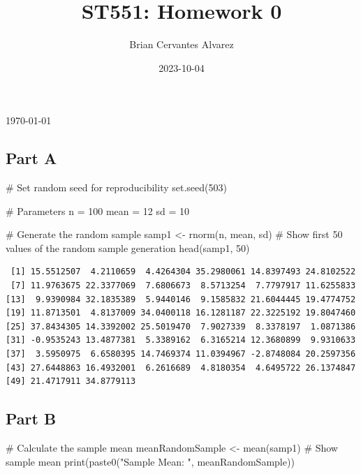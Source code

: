 \documentclass[
  letterpaper,
  DIV=11,
  numbers=noendperiod]{scrartcl}
\title{ST551: Homework 0}
\author{Brian Cervantes Alvarez}
\date{2023-10-04}
\makeatletter
\newenvironment{Shaded}{}{}
\newcommand{\CommentTok}[1]{\textcolor[rgb]{0.57,0.51,0.45}{#1}}
\newcommand{\DecValTok}[1]{\textcolor[rgb]{0.96,0.45,0.00}{#1}}
\newcommand{\FunctionTok}[1]{\textcolor[rgb]{0.41,0.62,0.42}{#1}}
\newcommand{\NormalTok}[1]{\textcolor[rgb]{0.24,0.22,0.21}{#1}}
\newcommand{\OtherTok}[1]{\textcolor[rgb]{0.41,0.62,0.42}{#1}}
\newcommand{\StringTok}[1]{\textcolor[rgb]{0.60,0.59,0.10}{#1}}
\renewcommand{\maketitle}{\bgroup\setlength{\parindent}{0pt}
\begin{flushleft}
  {\sffamily\huge\textbf{\MakeUppercase{\@title}}} \vspace{0.3cm} \newline
  {\Large {\@subtitle}} \newline
  {\large\@author} \newline
  {\large\today} %
\end{flushleft}\egroup
}
\makeatother
\begin{document}
\maketitle

\pagestyle{mystyle}

\subsection{Part A}\label{part-a}

\begin{Shaded}
\begin{Highlighting}[]
\CommentTok{\# Set random seed for reproducibility}
\FunctionTok{set.seed}\NormalTok{(}\DecValTok{503}\NormalTok{)}

\CommentTok{\# Parameters}
\NormalTok{n }\OtherTok{=} \DecValTok{100}
\NormalTok{mean }\OtherTok{=} \DecValTok{12}
\NormalTok{sd }\OtherTok{=} \DecValTok{10}

\CommentTok{\# Generate the random sample }
\NormalTok{samp1 }\OtherTok{\textless{}{-}} \FunctionTok{rnorm}\NormalTok{(n, mean, sd)}
\CommentTok{\# Show first 50 values of the random sample generation}
\FunctionTok{head}\NormalTok{(samp1, }\DecValTok{50}\NormalTok{)}
\end{Highlighting}
\end{Shaded}

\begin{verbatim}
 [1] 15.5512507  4.2110659  4.4264304 35.2980061 14.8397493 24.8102522
 [7] 11.9763675 22.3377069  7.6806673  8.5713254  7.7797917 11.6255833
[13]  9.9390984 32.1835389  5.9440146  9.1585832 21.6044445 19.4774752
[19] 11.8713501  4.8137009 34.0400118 16.1281187 22.3225192 19.8047460
[25] 37.8434305 14.3392002 25.5019470  7.9027339  8.3378197  1.0871386
[31] -0.9535243 13.4877381  5.3389162  6.3165214 12.3680899  9.9310633
[37]  3.5950975  6.6580395 14.7469374 11.0394967 -2.8748084 20.2597356
[43] 27.6448863 16.4932001  6.2616689  4.8180354  4.6495722 26.1374847
[49] 21.4717911 34.8779113
\end{verbatim}

\newpage{}

\subsection{Part B}\label{part-b}

\begin{Shaded}
\begin{Highlighting}[]
\CommentTok{\# Calculate the sample mean}
\NormalTok{meanRandomSample }\OtherTok{\textless{}{-}} \FunctionTok{mean}\NormalTok{(samp1)}
\CommentTok{\# Show sample mean}
\FunctionTok{print}\NormalTok{(}\FunctionTok{paste0}\NormalTok{(}\StringTok{"Sample Mean: "}\NormalTok{, meanRandomSample))}
\end{Highlighting}
\end{Shaded}
\end{document}
